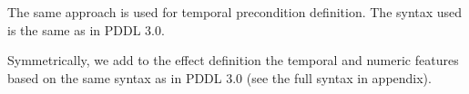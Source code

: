 \documentclass[letterpaper]{article} %
\begin{document}


%
%

\noindent The same approach is used for temporal precondition definition. The syntax used is the same as in PDDL 3.0.


%
%
\noindent Symmetrically, we add to the effect definition the temporal and numeric features based on the same syntax as in PDDL 3.0 (see the full syntax in appendix).


%
%

\end{document}
